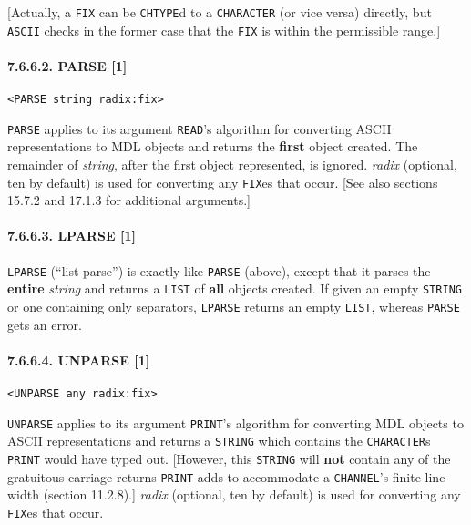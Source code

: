 \documentclass[a4paper,]{article}
\let\oldparagraph\paragraph
\renewcommand{\paragraph}[1]{\oldparagraph{#1}\mbox{}}
\begin{document}
{[}Actually, a \texttt{FIX} can be \texttt{CHTYPE}d to a \texttt{CHARACTER} (or vice versa) directly, but \texttt{ASCII}
checks in the former case that the \texttt{FIX} is within the permissible range.{]}

\paragraph{7.6.6.2. PARSE {[}1{]}}\label{parse-1}

\begin{verbatim}
<PARSE string radix:fix>
\end{verbatim}

 \texttt{PARSE} applies to its argument \texttt{READ}'s algorithm for converting ASCII
representations to MDL objects and returns the \textbf{first} object created. The remainder of \emph{string}, after the
first object represented, is ignored. \emph{radix} (optional, ten by default) is used for converting any \texttt{FIX}es
that occur. {[}See also sections 15.7.2 and 17.1.3 for additional arguments.{]}

\paragraph{7.6.6.3. LPARSE {[}1{]}}\label{lparse-1}

 \texttt{LPARSE} (``list parse'') is exactly like \texttt{PARSE} (above), except that it
parses the \textbf{entire} \emph{string} and returns a \texttt{LIST} of \textbf{all} objects created. If given an empty
\texttt{STRING} or one containing only separators, \texttt{LPARSE} returns an empty \texttt{LIST}, whereas \texttt{PARSE}
gets an error.

\paragraph{7.6.6.4. UNPARSE {[}1{]}}\label{unparse-1}

\begin{verbatim}
<UNPARSE any radix:fix>
\end{verbatim}

 \texttt{UNPARSE} applies to its argument \texttt{PRINT}'s algorithm for converting MDL
objects to ASCII representations and returns a \texttt{STRING} which contains the \texttt{CHARACTER}s \texttt{PRINT} would
have typed out. {[}However, this \texttt{STRING} will \textbf{not} contain any of the gratuitous carriage-returns
\texttt{PRINT} adds to accommodate a \texttt{CHANNEL}'s finite line-width (section 11.2.8).{]}
\emph{radix} (optional, ten by default) is used for converting any \texttt{FIX}es that occur.
\end{document}

